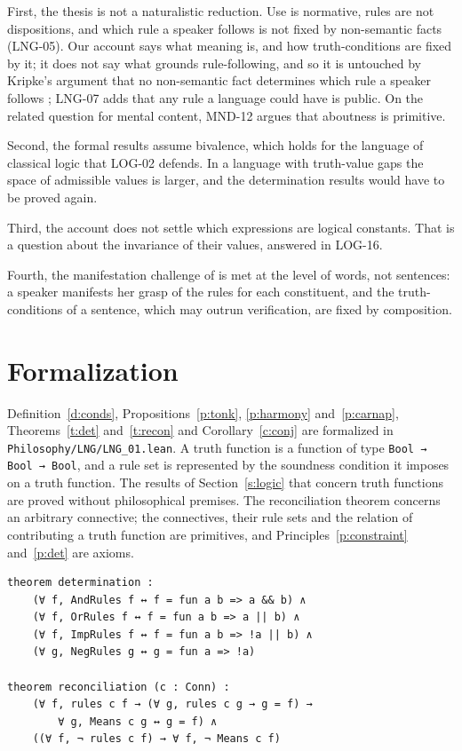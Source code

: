 \documentclass{situationist-preprint}
\begin{document}
First, the thesis is not a naturalistic reduction. Use is normative, rules are not dispositions, and which rule a speaker follows is not fixed by non-semantic facts (LNG-05). Our account says what meaning is, and how truth-conditions are fixed by it; it does not say what grounds rule-following, and so it is untouched by Kripke's argument that no non-semantic fact determines which rule a speaker follows \citep{Kripke1982}; LNG-07 adds that any rule a language could have is public. On the related question for mental content, MND-12 argues that aboutness is primitive.

Second, the formal results assume bivalence, which holds for the language of classical logic that LOG-02 defends. In a language with truth-value gaps the space of admissible values is larger, and the determination results would have to be proved again.

Third, the account does not settle which expressions are logical constants. That is a question about the invariance of their values, answered in LOG-16.

Fourth, the manifestation challenge of \citet{Dummett1975} is met at the level of words, not sentences: a speaker manifests her grasp of the rules for each constituent, and the truth-conditions of a sentence, which may outrun verification, are fixed by composition.

\section{Formalization}\label{s:formal}

Definition~\ref{d:conds}, Propositions~\ref{p:tonk}, \ref{p:harmony} and~\ref{p:carnap}, Theorems~\ref{t:det} and~\ref{t:recon} and Corollary~\ref{c:conj} are formalized in \nolinkurl{Philosophy/LNG/LNG_01.lean}. A truth function is a function of type \texttt{Bool → Bool → Bool}, and a rule set is represented by the soundness condition it imposes on a truth function. The results of Section~\ref{s:logic} that concern truth functions are proved without philosophical premises. The reconciliation theorem concerns an arbitrary connective; the connectives, their rule sets and the relation of contributing a truth function are primitives, and Principles~\ref{p:constraint} and~\ref{p:det} are axioms.

\begin{lstlisting}
theorem determination :
    (∀ f, AndRules f ↔ f = fun a b => a && b) ∧
    (∀ f, OrRules f ↔ f = fun a b => a || b) ∧
    (∀ f, ImpRules f ↔ f = fun a b => !a || b) ∧
    (∀ g, NegRules g ↔ g = fun a => !a)

theorem reconciliation (c : Conn) :
    (∀ f, rules c f → (∀ g, rules c g → g = f) →
        ∀ g, Means c g ↔ g = f) ∧
    ((∀ f, ¬ rules c f) → ∀ f, ¬ Means c f)
\end{lstlisting}
\end{document}
